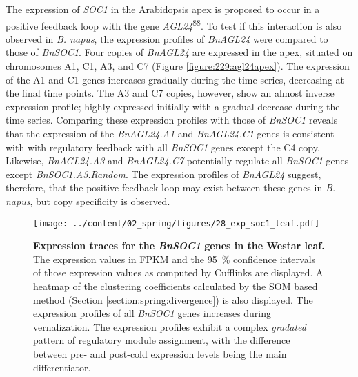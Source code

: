 \documentclass[12pt,]{book}
\begin{document}
The expression of \emph{SOC1} in the Arabidopsis apex is proposed to
occur in a positive feedback loop with the gene
\emph{AGL24}\textsuperscript{88}. To test if this interaction is also
observed in \emph{B. napus}, the expression profiles of \emph{BnAGL24}
were compared to those of \emph{BnSOC1}. Four copies of \emph{BnAGL24}
are expressed in the apex, situated on chromosomes A1, C1, A3, and C7
(Figure \ref{figure:229:agl24apex}). The expression of the A1 and C1
genes increases gradually during the time series, decreasing at the
final time points. The A3 and C7 copies, however, show an almost inverse
expression profile; highly expressed initially with a gradual decrease
during the time series. Comparing these expression profiles with those
of \emph{BnSOC1} reveals that the expression of the \emph{BnAGL24.A1}
and \emph{BnAGL24.C1} genes is consistent with with regulatory feedback
with all \emph{BnSOC1} genes except the C4 copy. Likewise,
\emph{BnAGL24.A3} and \emph{BnAGL24.C7} potentially regulate all
\emph{BnSOC1} genes except \emph{BnSOC1.A3.Random}. The expression
profiles of \emph{BnAGL24} suggest, therefore, that the positive
feedback loop may exist between these genes in \emph{B. napus}, but copy
specificity is observed.

\begin{figure}[htbp]
\centering
\texttt{[image: ../content/02\_spring/figures/28\_exp\_soc1\_leaf.pdf]}
\caption{\textbf{Expression traces for the \emph{BnSOC1} genes in the
Westar leaf.} The expression values in FPKM and the 95~\% confidence
intervals of those expression values as computed by Cufflinks are
displayed. A heatmap of the clustering coefficients calculated by the
SOM based method (Section \ref{section:spring:divergence}) is also
displayed. The expression profiles of all \emph{BnSOC1} genes increases
during vernalization. The expression profiles exhibit a complex
\emph{gradated} pattern of regulatory module assignment, with the
difference between pre- and post-cold expression levels being the main
differentiator.}\label{figure:228:soc1leaf}
\end{figure}
\end{document}
